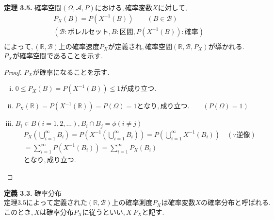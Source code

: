 \documentclass[dvipdfmx,10pt, a4j]{jarticle}
\theoremstyle{definition}
\begin{document}
    \noindent
    \textbf{定理 3.5.} $確率空間 (\Omega, \mathcal{A}, P) における, 確率変数 X に対して,$\\
    \begin{align*}
        &P_X(B) = P(X^{-1}(B)) \qquad (B \in \mathcal{B})\\
        &(\mathcal{B} : ボレルセット, B: 区間, P(X^{-1}(B)): 確率)\\
    \end{align*}
    $によって, (\mathbb{R}, \mathcal{B})上の確率速度 P_Xが定義され, 確率空間 (\mathbb{R}, \mathcal{B}, P_X) が導かれる.$\\
    $P_Xが確率空間であることを示す.$
    \begin{proof} $P_X が確率になることを示す.$\\
        \begin{enumerate}[i)]
            \item $0 \leq P_X(B) = P(X^{-1}(B)) \leq 1 が成り立つ.$\\
            \item $P_X(\mathbb{R}) = P(X^{-1}(\mathbb{R})) = P(\Omega) = 1 となり, 成り立つ. \qquad (P(\Omega) = 1)$\\
            \item $B_i \in B (i = 1, 2, \dots), B_i \cap B_j = \phi (i \neq j)$\\
            \begin{align*}
                &P_X(\bigcup_{i=1}^{\infty}{B_i}) = P(X^{-1}(\bigcup_{i=1}^{\infty}{B_i})) = P(\bigcup_{i=1}^{\infty}{X^{-1}(B_i)}) \quad (\because 逆像)\\
                &= \sum_{i=1}^{\infty}{P(X^{-1}(B_i))} = \sum_{i=1}^{\infty}{P_X(B_i)}\\
                &となり, 成り立つ.
            \end{align*}
        \end{enumerate}
    \end{proof}
    
    \noindent
    \textbf{定義 3.3.} 確率分布\\
    $定理3.5によって定義された(\mathbb{R}, \mathcal{B})上の確率測度 P_X は確率変数 X の\textbf{確率分布} と呼ばれる.$
    $このとき, X は確率分布 P_X に従うといい, X ~ P_Xと記す.$\\
    
\end{document}
